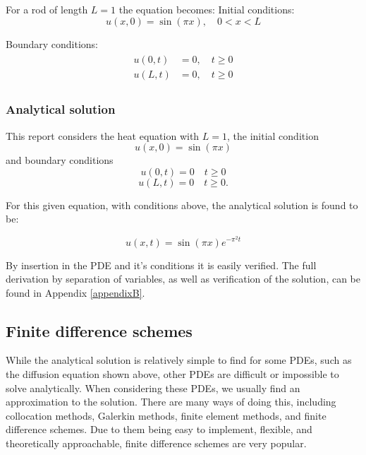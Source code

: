 For a rod of length $L = 1$ the equation becomes:
Initial conditions:
\begin{equation}
    u(x, 0) = \sin(\pi x), \quad 0 < x < L
\end{equation}

Boundary conditions:
\begin{align}
\begin{split}
    u(0,t) &= 0, \quad t\geq 0 \\
    u(L,t) &= 0, \quad t\geq 0
\end{split}
\end{align}

\subsubsection{Analytical solution}
This report considers the heat equation with $L=1$, the initial condition
\begin{equation}
u(x, 0) = \sin(\pi x)    
\end{equation}
and boundary conditions
\begin{equation}
    u(0, t)=0 \quad t\ge0
\end{equation}
\begin{equation}
    u(L, t)=0 \quad t\ge 0.
\end{equation}

For this given equation, with conditions above, the analytical solution is found to be: 

\begin{equation}\label{analytical_sol}
    u(x,t) = \sin(\pi x) e^{-\pi^2 t}
\end{equation}

By insertion in the PDE and it's conditions it is easily verified. The full derivation by separation of variables, as well as verification of the solution, can be found in Appendix \ref{appendixB}.

\subsection{Finite difference schemes}\label{sec:FD}
While the analytical solution is relatively simple to find for some PDEs, such as the diffusion equation shown above, other PDEs are difficult or impossible to solve analytically.
When considering these PDEs, we usually find an approximation to the solution.
There are many ways of doing this, including collocation methods, Galerkin methods, finite element methods, and finite difference schemes.
Due to them being easy to implement, flexible, and theoretically approachable, finite difference schemes are very popular.

